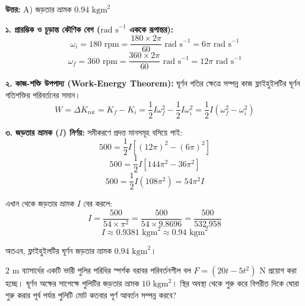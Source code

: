 \documentclass[12pt, a4paper]{article}
\begin{document}
{\vspace{0.5em}
\begin{tcolorbox}[answerbox]
\textbf{\color{success} উত্তর:} A) জড়তার ভ্রামক $0.94\text{ kgm}^2$
\end{tcolorbox}
\vspace{1em}

\begin{tcolorbox}[solutionbox={সমাধান (Solution)}]
\noindent
\textbf{১. প্রারম্ভিক ও চূড়ান্ত কৌণিক বেগ ($\text{rad s}^{-1}$ এককে রূপান্তর):}
$$\omega_i = 180\text{ rpm} = \frac{180 \times 2\pi}{60}\text{ rad s}^{-1} = 6\pi\text{ rad s}^{-1}$$
$$\omega_f = 360\text{ rpm} = \frac{360 \times 2\pi}{60}\text{ rad s}^{-1} = 12\pi\text{ rad s}^{-1}$$

\vspace{0.5em}
\textbf{২. কাজ-শক্তি উপপাদ্য (Work-Energy Theorem):}
ঘূর্ণন গতির ক্ষেত্রে সম্পন্ন কাজ ফ্লাইহুইলটির ঘূর্ণন গতিশক্তির পরিবর্তনের সমান। 
$$W = \Delta K_{\text{rot}} = K_f - K_i = \frac{1}{2} I \omega_f^2 - \frac{1}{2} I \omega_i^2 = \frac{1}{2} I (\omega_f^2 - \omega_i^2)$$

\vspace{0.5em}
\textbf{৩. জড়তার ভ্রামক ($I$) নির্ণয়:}
সমীকরণে প্রদত্ত মানসমূহ বসিয়ে পাই:
$$500 = \frac{1}{2} I \left[ (12\pi)^2 - (6\pi)^2 \right]$$
$$500 = \frac{1}{2} I \left[ 144\pi^2 - 36\pi^2 \right]$$
$$500 = \frac{1}{2} I (108\pi^2) = 54\pi^2 I$$

এখান থেকে জড়তার ভ্রামক $I$ বের করলে:
$$I = \frac{500}{54 \times \pi^2} = \frac{500}{54 \times 9.8696} = \frac{500}{532.958}$$
$$I \approx 0.9381\text{ kgm}^2 \approx 0.94\text{ kgm}^2$$

অতএব, ফ্লাইহুইলটির ঘূর্ণন জড়তার ভ্রামক $0.94\text{ kgm}^2$।
\end{tcolorbox}
\vspace{1em}


\begin{tcolorbox}[questionbox={প্রশ্ন (Question) 28}]
\noindent
$2\text{ m}$ ব্যাসার্ধের একটি ভারী পুলির পরিধির স্পর্শক বরাবর পরিবর্তনশীল বল $F = (20t - 5t^2)\text{ N}$ প্রয়োগ করা হচ্ছে। ঘূর্ণন অক্ষের সাপেক্ষে পুলিটির জড়তার ভ্রামক $10\text{ kgm}^2$। স্থির অবস্থা থেকে শুরু করে বিপরীত দিকে ঘোরা শুরু করার পূর্ব পর্যন্ত পুলিটি মোট কতবার পূর্ণ আবর্তন সম্পন্ন করবে?


\end{tcolorbox}}
\end{document}
